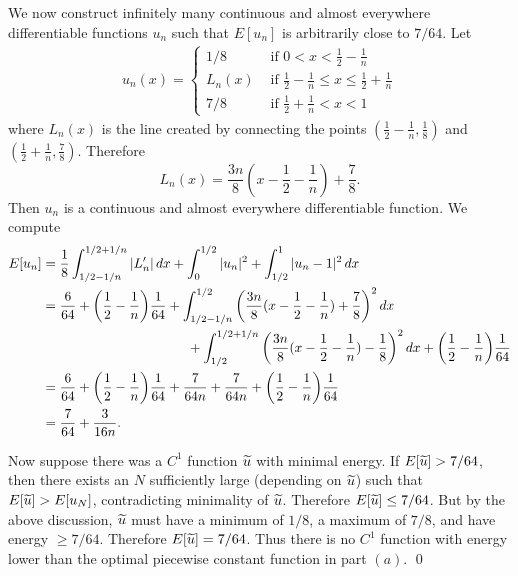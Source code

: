 We now construct infinitely many continuous and almost everywhere differentiable functions $u_{n}$ such that $E[u_n]$ is arbitrarily close to $7/64$.
Let
\begin{align*}
u_{n}(x) =
\begin{cases}
1/8 & \text{ if } 0 < x < \frac{1}{2} - \frac{1}{n}\\
L_{n}(x) & \text{ if } \frac{1}{2} - \frac{1}{n} \leq x \leq \frac{1}{2} + \frac{1}{n}\\
7/8 & \text{ if } \frac{1}{2} + \frac{1}{n} < x < 1
\end{cases}
\end{align*}
where $L_n(x)$ is the line created by connecting the points $(\frac{1}{2} - \frac{1}{n}, \frac{1}{8})$
and $(\frac{1}{2} + \frac{1}{n}, \frac{7}{8})$.
Therefore
$$L_{n}(x) = \frac{3n}{8}(x - \frac{1}{2} - \frac{1}{n}) + \frac{7}{8}.$$
Then $u_{n}$ is a continuous and almost everywhere differentiable function.
We compute
\begin{align*}
E[u_{n}] &= \frac{1}{8}\int_{1/2 - 1/n}^{1/2 + 1/n}|L_{n}'|\, dx + \int_{0}^{1/2}|u_{n}|^{2} + \int_{1/2}^{1}|u_{n} - 1|^{2}\, dx\\
&= \frac{6}{64} + \bigg(\frac{1}{2} - \frac{1}{n}\bigg)\frac{1}{64} + \int_{1/2 - 1/n}^{1/2}\bigg(\frac{3n}{8}(x - \frac{1}{2} - \frac{1}{n}) + \frac{7}{8}\bigg)^{2}\, dx\\
&\hspace{1.5in} + \int_{1/2}^{1/2 + 1/n}\bigg(\frac{3n}{8}(x - \frac{1}{2} - \frac{1}{n}) - \frac{1}{8}\bigg)^{2}\, dx + \bigg(\frac{1}{2} - \frac{1}{n}\bigg)\frac{1}{64}\\
&= \frac{6}{64} + \bigg(\frac{1}{2} - \frac{1}{n}\bigg)\frac{1}{64} + \frac{7}{64n} + \frac{7}{64n} + \bigg(\frac{1}{2} - \frac{1}{n}\bigg)\frac{1}{64}\\
& = \frac{7}{64} + \frac{3}{16n}.
\end{align*}

Now suppose there was a $C^{1}$ function $\widetilde{u}$ with minimal energy. If $E[\widetilde{u}] > 7/64$, then there exists an $N$ sufficiently large (depending on $\widetilde{u}$) such that $E[\widetilde{u}] > E[u_{N}]$,
contradicting minimality of $\widetilde{u}$. Therefore $E[\widetilde{u}] \leq 7/64$. But by the above discussion, $\widetilde{u}$ must have a minimum of $1/8$, a maximum of $7/8$, and
have energy $\geq 7/64$. Therefore $E[\widetilde{u}] = 7/64$. Thus there is no $C^{1}$ function with energy lower than the optimal piecewise constant function
in part $(a)$.
\hfill\qed

